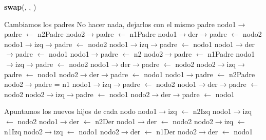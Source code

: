 \begin{Representacion}
\begin{Algoritmos}
\begin{algorithm}[H]{\textbf{swap}(, , )}
\begin{algorithmic}[1]
		\Comment Cambiamos los padres
			\State No hacer nada, dejarlos con el mismo padre
		\Else
				\State nodo1$\to$padre $\gets$ n2Padre	
				\State nodo2$\to$padre $\gets$ n1Padre
					\State nodo1$\to$der$\to$padre $\gets$ nodo2
				\EndIf
					\State nodo1$\to$izq$\to$padre $\gets$ nodo2
				\EndIf
					\State nodo1$\to$izq$\to$padre $\gets$ nodo1
				\EndIf
					\State nodo1$\to$der$\to$padre $\gets$ nodo1
				\EndIf
			\Else
					\State nodo1$\to$padre $\gets$ n2
					\State nodo2$\to$padre $\gets$ n1Padre	
						\State nodo1$\to$izq$\to$padre $\gets$ nodo2					
					\EndIf
						\State nodo1$\to$der$\to$padre $\gets$ nodo2					
					\EndIf
						\State nodo2$\to$izq$\to$padre $\gets$ nodo1
					\EndIf
						\State nodo2$\to$der$\to$padre $\gets$ nodo1
					\EndIf
				\Else
						\State nodo1$\to$padre $\gets$ n2Padre
						\State nodo2$\to$padre = n1
							\State nodo1$\to$izq$\to$padre $\gets$ nodo2
						\EndIf
							\State nodo1$\to$der$\to$padre $\gets$ nodo2
						\EndIf
							\State nodo2$\to$izq$\to$padre $\gets$ nodo1
						\EndIf
							\State nodo2$\to$der$\to$padre $\gets$ nodo1
						\EndIf
					\EndIf
				\EndIf
			
				\Comment Apuntamos los nuevos hijos de cada nodo			
				\State nodo1$\to$izq $\gets$ n2Izq
					\State nodo1$\to$izq $\gets$ nodo2
				\EndIf
				\State nodo1$\to$der $\gets$ n2Der
					\State nodo1$\to$der $\gets$ nodo2
				\EndIf
				\State nodo2$\to$izq $\gets$ n1Izq
					\State nodo2$\to$izq $\gets$ nodo1
				\EndIf
				\State nodo2$\to$der $\gets$ n1Der
					\State nodo2$\to$der $\gets$ nodo1
				\EndIf
				

\end{algorithmic}
\end{algorithm}
\end{Algoritmos}
\end{Representacion}
